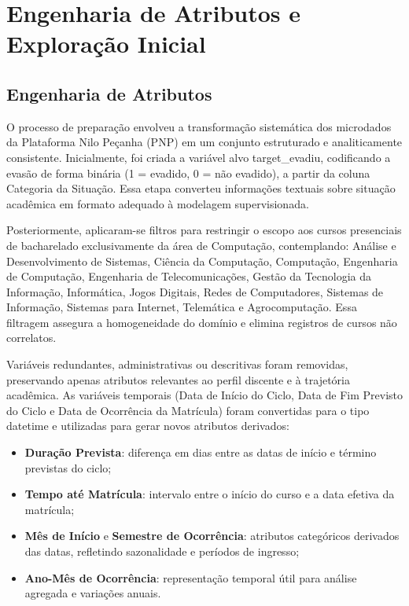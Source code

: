 \documentclass[english, spanish, brazilian]{RBIEarticle} %
\begin{document}
\section{Engenharia de Atributos e Exploração Inicial}

\subsection{Engenharia de Atributos}
O processo de preparação envolveu a transformação sistemática dos microdados da Plataforma Nilo Peçanha (PNP) em um conjunto estruturado e analiticamente consistente.  
Inicialmente, foi criada a variável alvo \mbox{target\_evadiu}, codificando a evasão de forma binária (1 = evadido, 0 = não evadido), a partir da coluna Categoria da Situação. Essa etapa converteu informações textuais sobre situação acadêmica em formato adequado à modelagem supervisionada.

Posteriormente, aplicaram-se filtros para restringir o escopo aos cursos presenciais de bacharelado exclusivamente da área de Computação, contemplando: Análise e Desenvolvimento de Sistemas, Ciência da Computação, Computação, Engenharia de Computação, Engenharia de Telecomunicações, Gestão da Tecnologia da Informação, Informática, Jogos Digitais, Redes de Computadores, Sistemas de Informação, Sistemas para Internet, Telemática e Agrocomputação.  
Essa filtragem assegura a homogeneidade do domínio e elimina registros de cursos não correlatos.

Variáveis redundantes, administrativas ou descritivas foram removidas, preservando apenas atributos relevantes ao perfil discente e à trajetória acadêmica. As variáveis temporais (Data de Início do Ciclo, Data de Fim Previsto do Ciclo e Data de Ocorrência da Matrícula) foram convertidas para o tipo datetime e utilizadas para gerar novos atributos derivados:

\begin{itemize}
    \item \textbf{Duração Prevista}: diferença em dias entre as datas de início e término previstas do ciclo;
    \item \textbf{Tempo até Matrícula}: intervalo entre o início do curso e a data efetiva da matrícula;
    \item \textbf{Mês de Início} e \textbf{Semestre de Ocorrência}: atributos categóricos derivados das datas, refletindo sazonalidade e períodos de ingresso;
    \item \textbf{Ano-Mês de Ocorrência}: representação temporal útil para análise agregada e variações anuais.
\end{itemize}
\end{document}
